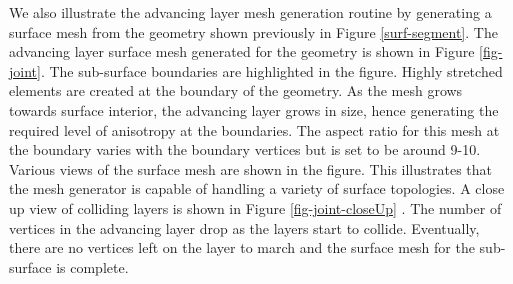 \documentclass[conf]{new-aiaa}
\begin{document}
We also illustrate the advancing layer mesh generation routine by generating a surface mesh from the geometry shown previously in Figure \ref{surf-segment}. The advancing layer surface mesh generated for the geometry is shown in Figure \ref{fig-joint}. The sub-surface boundaries are highlighted in the figure. Highly stretched elements are created at the boundary of the geometry. As the mesh grows towards surface interior, the advancing layer grows in size, hence generating the required level of anisotropy at the boundaries. The aspect ratio for this mesh at the boundary varies with the boundary vertices but is set to be around 9-10. Various views of the surface mesh are shown in the figure. This illustrates that the mesh generator is capable of handling a variety of surface topologies. A close up view of colliding layers is shown in Figure \ref{fig-joint-closeUp} . The number of vertices in the advancing layer drop as the layers start to collide. Eventually, there are no vertices left on the layer to march and the surface mesh for the sub-surface is complete.
\end{document}
